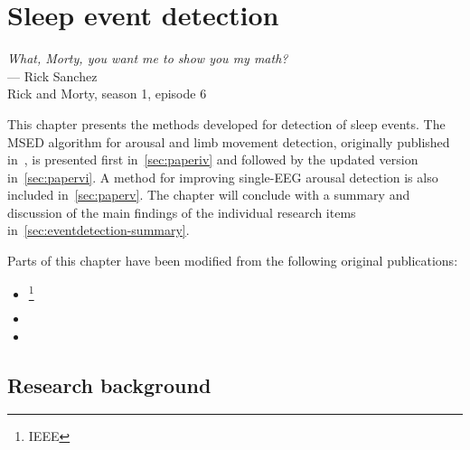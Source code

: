 \chapter{Sleep event detection}\label{chap:sleep-event-detection}
\begin{flushright}{\slshape 
        What, Morty, you want me to show you my math?} \\ \medskip
        --- Rick Sanchez\\Rick and Morty, season 1, episode 6
\end{flushright}
\vspace{3cm}

This chapter presents the methods developed for detection of sleep events.
The \ac{MSED} algorithm for arousal and limb movement detection, originally published in~\cite{Olesen2019}, is presented first in~\cref{sec:paperiv} and followed by the updated version in~\cref{sec:papervi}. 
A method for improving single-\ac{EEG} arousal detection is also included in~\cref{sec:paperv}. 
The chapter will conclude with a summary and discussion of the main findings of the individual research items in~\cref{sec:eventdetection-summary}.

Parts of this chapter have been modified from the following original publications:
\begin{itemize}
    \item {}\footnote{ IEEE}
    \item {}
    \item {}
\end{itemize}


\section{Research background}

